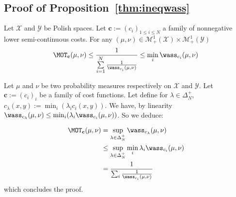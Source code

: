 \subsection{Proof of Proposition~\ref{thm:ineqwass}}
\begin{prop*}
Let  $\mathcal{X}$ and $\mathcal{Y}$ be Polish spaces. Let $\mathbf{c}:=(c_i)_{1\leq i\leq N}$ a family of nonnegative lower semi-continuous costs. For any $(\mu,\nu)\in\mathcal{M}_+^{1}(\mathcal{X})\times\mathcal{M}_+^{1}(\mathcal{Y})$  
\begin{align*}
    \MOT_{\mathbf{c}}(\mu,\nu)\leq \frac{1}{\sum\limits_{i=1}^N\frac{1}{\wass_{c_i}(\mu,\nu)}} \leq \min_i \wass_{c_i}(\mu,\nu)
\end{align*}
\end{prop*}
\begin{prv*}
Let $\mu$ and $\nu$ be two probability measures respectively on $\mathcal{X}$ and $\mathcal{Y}$. Let $\mathbf{c}:=(c_i)_i$ be a family of cost functions. Let define for $\lambda\in\Delta_N^{+}$, $c_\lambda(x,y) := \min_i(\lambda_i c_i(x,y))$. We have, by linearity $\wass_{c_\lambda}(\mu,\nu)\leq \min_i(\lambda_i \wass_{c_i}(\mu,\nu))$. So we deduce:

\begin{align*}
    \MOT_{\mathbf{c}}(\mu,\nu)&=\sup_{\lambda\in\Delta_N^{+}} \wass_{c_\lambda}(\mu,\nu)\\
    &\leq\sup_{\lambda\in\Delta_N^{+}} \min_i\lambda_i \wass_{c_i}(\mu,\nu)\\
    &= \frac{1}{\sum_i\frac{1}{\wass_{c_i}(\mu,\nu)}}\\ 
\end{align*}
which concludes the proof.
\end{prv*}




